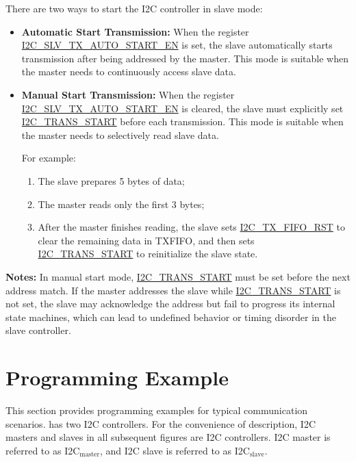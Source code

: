 \documentclass[main\_\_EN.tex]{subfiles}
\begin{document}
There are two ways to start the I2C controller in slave mode:

\begin{itemize}
  \item \textbf{Automatic Start Transmission:}
  When the register \hyperref[fielddesc:I2CSLVTXAUTOSTARTEN]{I2C\_SLV\_TX\_AUTO\_START\_EN} is set, the slave automatically starts transmission after being addressed by the master.
  This mode is suitable when the master needs to continuously access slave data.

  \item \textbf{Manual Start Transmission:}
  When the register \hyperref[fielddesc:I2CSLVTXAUTOSTARTEN]{I2C\_SLV\_TX\_AUTO\_START\_EN} is cleared, the slave must explicitly set \hyperref[fielddesc:I2CTRANSSTART]{I2C\_TRANS\_START} before each transmission.
  This mode is suitable when the master needs to selectively read slave data.

  For example:
  \begin{enumerate}
    \item The slave prepares 5 bytes of data;
    \item The master reads only the first 3 bytes;
    \item After the master finishes reading, the slave sets \hyperref[fielddesc:I2CTXFIFORST]{I2C\_TX\_FIFO\_RST} to clear the remaining data in TXFIFO, and then sets \hyperref[fielddesc:I2CTRANSSTART]{I2C\_TRANS\_START} to reinitialize the slave state.
  \end{enumerate}
\end{itemize}

{\bfseries Notes:}
In manual start mode, \hyperref[fielddesc:I2CTRANSSTART]{I2C\_TRANS\_START} must be set before the next address match. If the master addresses the slave while \hyperref[fielddesc:I2CTRANSSTART]{I2C\_TRANS\_START} is not set, the slave may acknowledge the address but fail to progress its internal state machines, which can lead to undefined behavior or timing disorder in the slave controller.


\section{Programming Example}\label{subsec:i2c-prom-guide}
This section provides programming examples for typical communication scenarios. \chipname{} has two I2C controllers. For the convenience of description, I2C masters and slaves in all subsequent figures are \chipname{} I2C controllers. I2C master is referred to as I2C$_\text{master}$, and I2C slave is referred to as I2C$_\text{slave}$.
\end{document}
